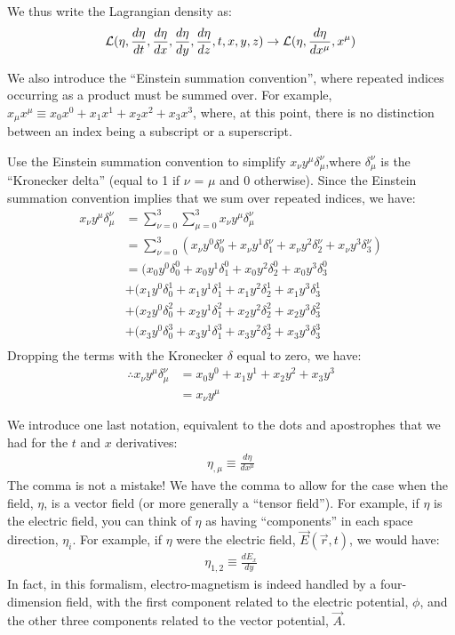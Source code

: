 We thus write the Lagrangian density as:
\begin{align}
\mathcal{L}(\eta,\frac{d\eta}{dt},\frac{d\eta}{dx},\frac{d\eta}{dy},\frac{d\eta}{dz},t,x,y,z)\to\mathcal{L}(\eta,\frac{d\eta}{dx^\mu},x^\mu)
\end{align}

We also introduce the ``Einstein summation convention'', where repeated indices occurring as a product must be summed over. For example, $x_\mu x^\mu\equiv x_0x^0+x_1x^1+x_2x^2+x_3x^3$, where, at this point, there is no distinction between an index being a subscript or a superscript.

\begin{example}{0pt}{Use the Einstein summation convention to simplify $x_\nu y^\mu \delta^\nu_\mu$,where $\delta^\nu_\mu$ is the ``Kronecker delta'' (equal to 1 if $\nu$ = $\mu$ and 0 otherwise). }{}
Since the Einstein summation convention implies that we sum over repeated indices, we have:
\begin{align*}
x_\nu y^\mu \delta^\nu_\mu&=\sum_{\nu=0}^3\sum_{\mu=0}^3x_\nu y^\mu \delta^\nu_\mu\\
&=\sum_{\nu=0}^3(x_\nu y^0 \delta^\nu_0+ x_\nu y^1 \delta^\nu_1+x_\nu y^2 \delta^\nu_2+x_\nu y^3 \delta^\nu_3 )\\
&=(x_0 y^0 \delta^0_0+ x_0 y^1 \delta^0_1+x_0 y^2 \delta^0_2+x_0 y^3 \delta^0_3\\
&+(x_1 y^0 \delta^1_0+ x_1 y^1 \delta^1_1+x_1 y^2 \delta^1_2+x_1 y^3 \delta^1_3\\
&+(x_2 y^0 \delta^2_0+ x_2 y^1 \delta^2_1+x_2 y^2 \delta^2_2+x_2 y^3 \delta^2_3\\
&+(x_3 y^0 \delta^3_0+ x_3 y^1 \delta^3_1+x_3 y^2 \delta^3_2+x_3 y^3 \delta^3_3\\
\end{align*}
Dropping the terms with the Kronecker $\delta$ equal to zero, we have:
\begin{align*}
\therefore x_\nu y^\mu \delta^\nu_\mu&=x_0y^0+x_1y^1+x_2y^2+x_3y^3\\
&=x_\nu y^\mu
\end{align*}

\end{example}

We introduce one last notation, equivalent to the dots and apostrophes that we had for the $t$ and $x$ derivatives:
\begin{align}
\eta_{,\mu}\equiv\frac{d\eta}{dx^\mu}
\end{align}
The comma is not a mistake! We have the comma to allow for the case when the field, $\eta$, is a vector field (or more generally a ``tensor field''). For example, if $\eta$ is the electric field, you can think of $\eta$ as having ``components'' in each space direction, $\eta_i$. For example, if $\eta$ were the electric field, $\vec E(\vec r,t)$, we would have:
\begin{align}
\eta_{1,2}\equiv\frac{dE_x}{dy}
\end{align}
In fact, in this formalism, electro-magnetism is indeed handled by a four-dimension field, with the first component related to the electric potential, $\phi$, and the other three components related to the vector potential, $\vec A$.

